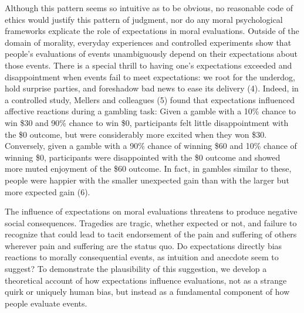 \documentclass[9pt,twocolumn,twoside,]{pnas-new}
\begin{document}
Although this pattern seems so intuitive as to be obvious, no reasonable
code of ethics would justify this pattern of judgment, nor do any moral
psychological frameworks explicate the role of expectations in moral
evaluations. Outside of the domain of morality, everyday experiences and
controlled experiments show that people's evaluations of events
unambiguously depend on their expectations about those events. There is
a special thrill to having one's expectations exceeded and
disappointment when events fail to meet expectations: we root for the
underdog, hold surprise parties, and foreshadow bad news to ease its
delivery (4). Indeed, in a controlled study, Mellers and colleagues (5)
found that expectations influenced affective reactions during a gambling
task: Given a gamble with a 10\% chance to win \$30 and 90\% chance to
win \$0, participants felt little disappointment with the \$0 outcome,
but were considerably more excited when they won \$30. Conversely, given
a gamble with a 90\% chance of winning \$60 and 10\% chance of winning
\$0, participants were disappointed with the \$0 outcome and showed more
muted enjoyment of the \$60 outcome. In fact, in gambles similar to
these, people were happier with the smaller unexpected gain than with
the larger but more expected gain (6).

The influence of expectations on moral evaluations threatens to produce
negative social consequences. Tragedies are tragic, whether expected or
not, and failure to recognize that could lead to tacit endorsement of
the pain and suffering of others wherever pain and suffering are the
status quo. Do expectations directly bias reactions to morally
consequential events, as intuition and anecdote seem to suggest? To
demonstrate the plausibility of this suggestion, we develop a
theoretical account of how expectations influence evaluations, not as a
strange quirk or uniquely human bias, but instead as a fundamental
component of how people evaluate events.
\end{document}
